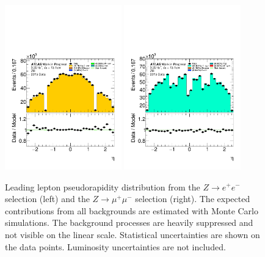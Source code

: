 \begin{figure}[htbp]
\centering
\includegraphics[width=0.45\textwidth]{figures/ZR/dataMc-lep_0_eta-ZR-el.pdf}
\includegraphics[width=0.45\textwidth]{figures/ZR/dataMc-lep_0_eta-ZR-mu.pdf}
\caption{
Leading lepton pseudorapidity distribution from the $Z \rightarrow e^+e^-$ selection (left) and the $Z \rightarrow \mu^+\mu^-$  selection (right).
The expected contributions from all backgrounds are estimated with Monte Carlo simulations.
The background processes are heavily suppressed and not visible on the linear scale. 
Statistical uncertainties are shown on the data points.
Luminosity uncertainties are not included.
}
\label{fig:ZR_lep_0_eta}
\end{figure}

